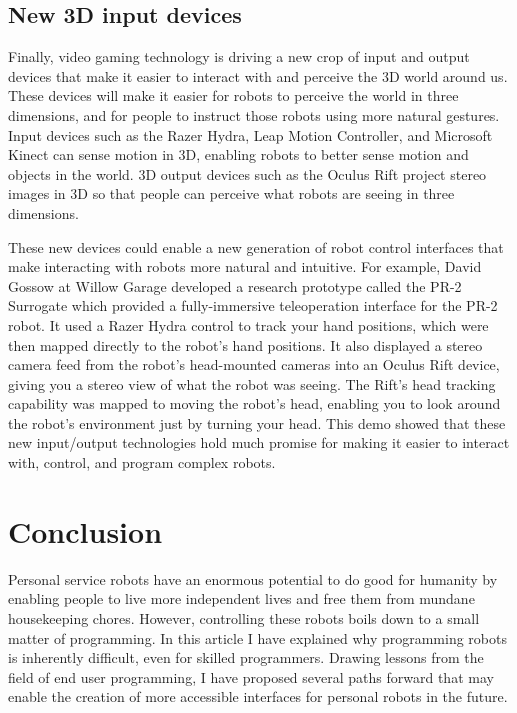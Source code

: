 \documentclass[10pt,twocolumn]{article}
\begin{document}
\begin{changebar}
\subsection{New 3D input devices}

Finally, video gaming technology is driving a new crop of input and output devices that make it easier to interact with and perceive the 3D world around us. These devices will make it easier for robots to perceive the world in three dimensions, and for people to instruct those robots using more natural gestures. Input devices such as the Razer Hydra, Leap Motion Controller, and Microsoft Kinect can sense motion in 3D, enabling robots to better sense motion and objects in the world. 3D output devices such as the Oculus Rift project stereo images in 3D so that people can perceive what robots are seeing in three dimensions.

These new devices could enable a new generation of robot control interfaces that make interacting with robots more natural and intuitive. For example, David Gossow at Willow Garage developed a research prototype called the PR-2 Surrogate which provided a fully-immersive teleoperation interface for the PR-2 robot. It used a Razer Hydra control to track your hand positions, which were then mapped directly to the robot's hand positions. It also displayed a stereo camera feed from the robot's head-mounted cameras into an Oculus Rift device, giving you a stereo view of what the robot was seeing. The Rift's head tracking capability was mapped to moving the robot's head, enabling you to look around the robot's environment just by turning your head. This demo showed that these new input/output technologies hold much promise for making it easier to interact with, control, and program complex robots.

\section{Conclusion}

Personal service robots have an enormous potential to do good for humanity by enabling people to live more independent lives and free them from mundane housekeeping chores. However, controlling these robots boils down to a small matter of programming. In this article I have explained why programming robots is inherently difficult, even for skilled programmers.  Drawing lessons from the field of end user programming, I have proposed several paths forward that may enable the creation of more accessible interfaces for personal robots in the future.
\end{changebar}
\end{document}
